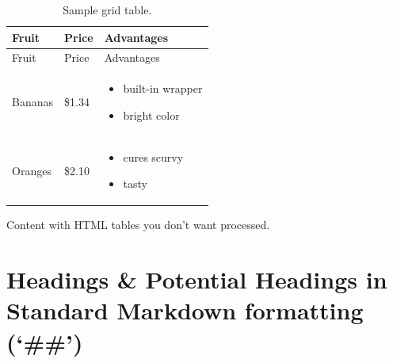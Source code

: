 \documentclass[
  11pt,
  letterpaper,
]{book}
\providecommand{\tightlist}{%
  \setlength{\itemsep}{0pt}\setlength{\parskip}{0pt}}
\begin{document}
\begin{longtable}[]{@{}
  >{\raggedright\arraybackslash}p{}
  >{\raggedright\arraybackslash}p{}
  >{\raggedright\arraybackslash}p{}@{}}
\caption{Sample grid table.}\tabularnewline
\toprule\noalign{}
\begin{minipage}[b]{\linewidth}\raggedright
Fruit
\end{minipage} & \begin{minipage}[b]{\linewidth}\raggedright
Price
\end{minipage} & \begin{minipage}[b]{\linewidth}\raggedright
Advantages
\end{minipage} \\
\midrule\noalign{}
\endfirsthead
\toprule\noalign{}
\begin{minipage}[b]{\linewidth}\raggedright
Fruit
\end{minipage} & \begin{minipage}[b]{\linewidth}\raggedright
Price
\end{minipage} & \begin{minipage}[b]{\linewidth}\raggedright
Advantages
\end{minipage} \\
\midrule\noalign{}
\endhead
\bottomrule\noalign{}
\endlastfoot
Bananas & \$1.34 & \begin{minipage}[t]{\linewidth}\raggedright
\begin{itemize}
\tightlist
\item
  built-in wrapper
\item
  bright color
\end{itemize}
\end{minipage} \\
Oranges & \$2.10 & \begin{minipage}[t]{\linewidth}\raggedright
\begin{itemize}
\tightlist
\item
  cures scurvy
\item
  tasty
\end{itemize}
\end{minipage} \\
\end{longtable}

Content with HTML tables you don't want processed.

\section*{Headings \& Potential Headings in Standard Markdown formatting
(`\#\#')}\label{sec-heading}
\end{document}
